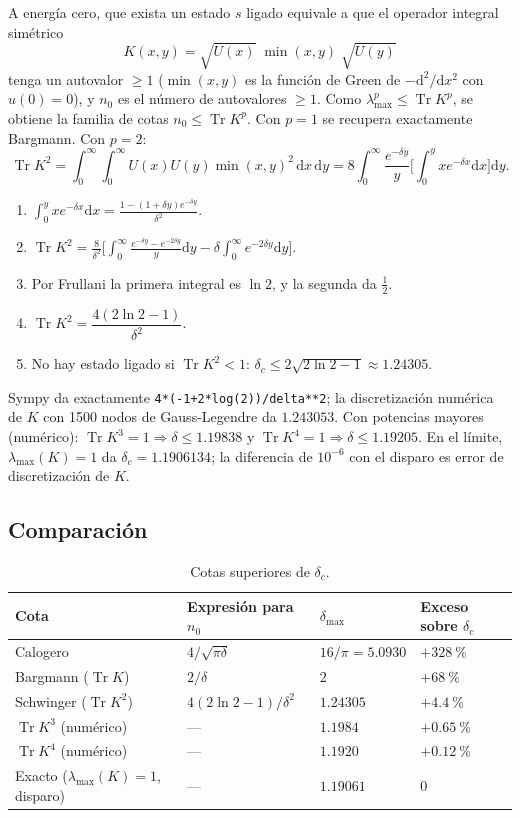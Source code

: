 \documentclass[11pt]{article}
\newcommand{\dd}{\mathrm{d}}
\newcommand{\dc}{\delta_c}
\newcommand{\Tr}{\operatorname{Tr}}
\begin{document}
A energía cero, que exista un estado $s$ ligado equivale a que el operador integral simétrico
\[
K(x,y)=\sqrt{U(x)}\;\min(x,y)\;\sqrt{U(y)}
\]
tenga un autovalor $\ge1$ ($\min(x,y)$ es la función de Green de $-\dd^2/\dd x^2$ con $u(0)=0$), y $n_0$ es el número de autovalores $\ge1$. Como $\lambda_{\max}^p\le\Tr K^p$, se obtiene la familia de cotas $n_0\le\Tr K^p$. Con $p=1$ se recupera exactamente Bargmann. Con $p=2$:
\[
\Tr K^2=\int_0^\infty\!\!\int_0^\infty U(x)U(y)\min(x,y)^2\,\dd x\,\dd y=8\int_0^\infty\frac{e^{-\delta y}}{y}\Big[\int_0^yxe^{-\delta x}\dd x\Big]\dd y .
\]
\begin{enumerate}
\item $\int_0^yxe^{-\delta x}\dd x=\frac{1-(1+\delta y)e^{-\delta y}}{\delta^2}$.
\item $\Tr K^2=\frac{8}{\delta^2}\Big[\int_0^\infty\frac{e^{-\delta y}-e^{-2\delta y}}{y}\dd y-\delta\int_0^\infty e^{-2\delta y}\dd y\Big]$.
\item Por Frullani la primera integral es $\ln2$, y la segunda da $\tfrac12$.
\item $\Tr K^2=\dfrac{4(2\ln2-1)}{\delta^2}$.
\item No hay estado ligado si $\Tr K^2<1$: $\dc\le2\sqrt{2\ln2-1}\approx1.24305$.
\end{enumerate}
Sympy da exactamente \texttt{4*(-1+2*log(2))/delta**2}; la discretización numérica de $K$ con 1500 nodos de Gauss-Legendre da $1.243053$. Con potencias mayores (numérico): $\Tr K^3=1\Rightarrow\delta\le1.19838$ y $\Tr K^4=1\Rightarrow\delta\le1.19205$. En el límite, $\lambda_{\max}(K)=1$ da $\dc=1.1906134$; la diferencia de $10^{-6}$ con el disparo es error de discretización de $K$.

\subsection{Comparación}

\begin{table}[H]
\centering
\small
\caption{Cotas superiores de $\dc$.}
\begin{tabular}{@{}llll@{}}
\toprule
\textbf{Cota} & \textbf{Expresión para $n_0$} & $\delta_{\max}$ & \textbf{Exceso sobre $\dc$}\\
\midrule
Calogero & $4/\sqrt{\pi\delta}$ & $16/\pi=5.0930$ & $+328~\%$\\
Bargmann ($\Tr K$) & $2/\delta$ & $2$ & $+68~\%$\\
Schwinger ($\Tr K^2$) & $4(2\ln2-1)/\delta^2$ & $1.24305$ & $+4.4~\%$\\
$\Tr K^3$ (numérico) & --- & $1.1984$ & $+0.65~\%$\\
$\Tr K^4$ (numérico) & --- & $1.1920$ & $+0.12~\%$\\
Exacto ($\lambda_{\max}(K)=1$, disparo) & --- & $1.19061$ & $0$\\
\bottomrule
\end{tabular}
\end{table}
\end{document}
